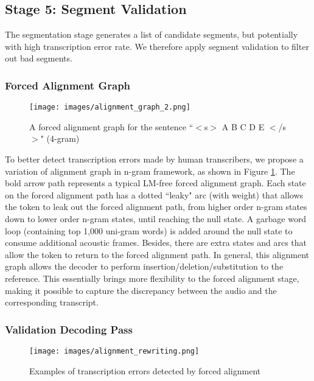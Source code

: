 \documentclass[a4paper]{article}
\begin{document}
\subsection{Stage 5: Segment Validation}
The segmentation stage generates a list of candidate segments, but potentially
with high transcription error rate. We therefore apply segment validation to
filter out bad segments.

\subsubsection{Forced Alignment Graph}
\begin{figure}[t]
  \centering
  \texttt{[image: images/alignment\_graph\_2.png]}
  \vspace{-5ex}
  \caption{A forced alignment graph for the sentence ``$<$s$>$ A B C D E $<$/s$>$" (4-gram)}
  \label{fig:alignment_graph}
  \vspace{-2ex}
\end{figure}

To better detect transcription errors made by human transcribers, we propose a
variation of alignment graph in n-gram framework, as shown in Figure \ref{fig:alignment_graph}.
The bold arrow path represents a typical LM-free forced alignment graph.
Each state on the forced alignment path has a dotted ``leaky" arc (with weight) that allows
the token to leak out the forced alignment path, from higher order n-gram states
down to lower order n-gram states, until reaching the null state. A garbage word
loop (containing top 1,000 uni-gram words) is added around the null state to consume
additional acoustic frames. Besides, there are extra states and arcs that allow the token
to return to the forced alignment path. In general, this alignment graph allows
the decoder to perform insertion/deletion/substitution to the reference. This essentially brings more flexibility to the forced alignment stage, making it possible to capture the discrepancy between the audio and the corresponding transcript.

\subsubsection{Validation Decoding Pass}
\begin{figure*}[t]
  \centering
  \vspace{-2ex}
  \texttt{[image: images/alignment\_rewriting.png]}
  \vspace{-4ex}
  \caption{Examples of transcription errors detected by forced alignment}
  \vspace{-2ex}
  \label{fig:alignment_rewriting}
\end{figure*}
\end{document}
